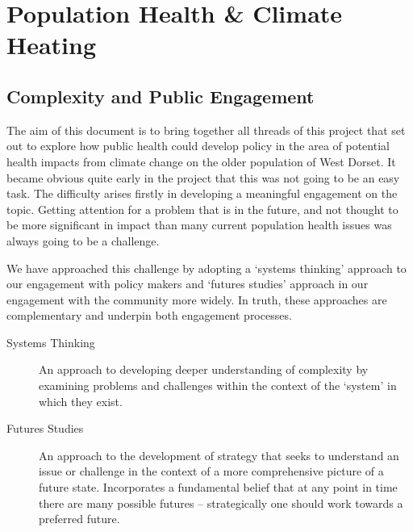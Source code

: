 \chapter{Population Health \& Climate Heating}


\section{Complexity and Public Engagement}
The aim of this document is to bring together all threads of this project that set out to explore how public health could develop policy in the area of potential health impacts from climate change on the older population of West Dorset. It became obvious quite early in the project that this was not going to be an easy task. The difficulty arises firstly in developing a meaningful engagement on the topic. Getting attention for a problem that is in the future, and not thought to be more significant in impact than many current population health issues was always going to be a challenge.

We have approached this challenge by adopting a `systems thinking' approach to our engagement with policy makers and `futures studies' approach in our engagement with the community more widely. In truth, these approaches are complementary and underpin both engagement processes.

\begin{description}
	\item[Systems Thinking]An approach to developing deeper understanding of complexity by examining problems and challenges within the context of the `system' in which they exist.
	\item[Futures Studies] An approach to the development of strategy that seeks to understand an issue or challenge in the context of a more comprehensive picture of a future state. Incorporates a fundamental belief that at any point in time there are many possible futures -- strategically one should work towards a preferred future.
\end{description}


